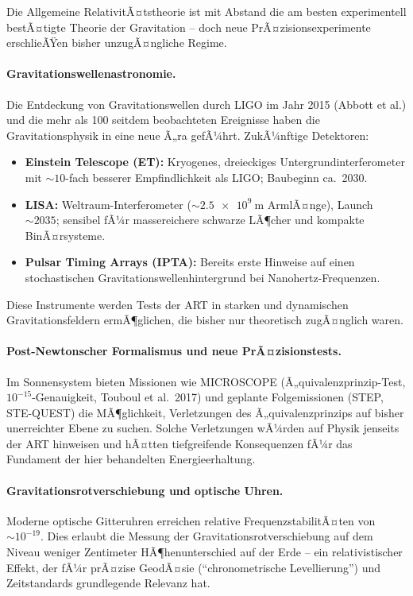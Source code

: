 ﻿\documentclass[12pt, a4paper]{report}
\theoremstyle{definition}
\theoremstyle{remark}
\begin{document}
Die Allgemeine RelativitÃ¤tstheorie ist mit Abstand die am besten experimentell
bestÃ¤tigte Theorie der Gravitation -- doch neue PrÃ¤zisionsexperimente erschlieÃŸen
bisher unzugÃ¤ngliche Regime.

\paragraph{Gravitationswellenastronomie.}
Die Entdeckung von Gravitationswellen durch LIGO im Jahr 2015 (Abbott et al.)
und die mehr als 100 seitdem beobachteten Ereignisse haben die Gravitationsphysik
in eine neue Ã„ra gefÃ¼hrt. ZukÃ¼nftige Detektoren:
\begin{itemize}
  \item \textbf{Einstein Telescope (ET):} Kryogenes, dreieckiges Untergrundinterferometer
        mit $\sim 10$-fach besserer Empfindlichkeit als LIGO; Baubeginn ca.\ 2030.
  \item \textbf{LISA:} Weltraum-Interferometer ($\sim \SI{2.5e9}{\metre}$ ArmlÃ¤nge),
        Launch $\sim 2035$; sensibel fÃ¼r massereichere schwarze LÃ¶cher und
        kompakte BinÃ¤rsysteme.
  \item \textbf{Pulsar Timing Arrays (IPTA):} Bereits erste Hinweise auf einen
        stochastischen Gravitationswellenhintergrund bei Nanohertz-Frequenzen.
\end{itemize}
Diese Instrumente werden Tests der ART in starken und dynamischen Gravitationsfeldern
ermÃ¶glichen, die bisher nur theoretisch zugÃ¤nglich waren.

\paragraph{Post-Newtonscher Formalismus und neue PrÃ¤zisionstests.}
Im Sonnensystem bieten Missionen wie MICROSCOPE (Ã„quivalenzprinzip-Test,
$10^{-15}$-Genauigkeit, Touboul et al.\ 2017) und geplante Folgemissionen
(STEP, STE-QUEST) die MÃ¶glichkeit, Verletzungen des Ã„quivalenzprinzips auf
bisher unerreichter Ebene zu suchen. Solche Verletzungen wÃ¼rden auf Physik
jenseits der ART hinweisen und hÃ¤tten tiefgreifende Konsequenzen fÃ¼r das
Fundament der hier behandelten Energieerhaltung.

\paragraph{Gravitationsrotverschiebung und optische Uhren.}
Moderne optische Gitteruhren erreichen relative FrequenzstabilitÃ¤ten von
$\sim 10^{-19}$. Dies erlaubt die Messung der Gravitationsrotverschiebung
auf dem Niveau weniger Zentimeter HÃ¶henunterschied auf der Erde -- ein
relativistischer Effekt, der fÃ¼r prÃ¤zise GeodÃ¤sie (``chronometrische
Levellierung'') und Zeitstandards grundlegende Relevanz hat.
\end{document}

